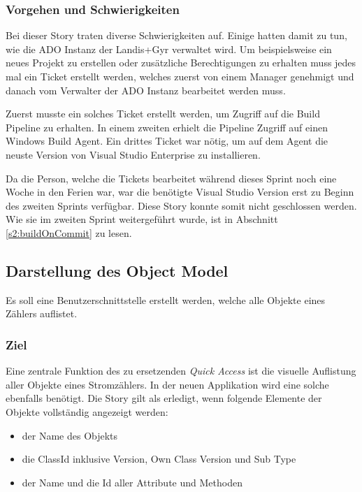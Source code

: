 \subsubsection{Vorgehen und Schwierigkeiten}
Bei dieser Story traten diverse Schwierigkeiten auf.
Einige hatten damit zu tun, wie die \ac{ADO} Instanz der Landis+Gyr verwaltet wird.
Um beispielsweise ein neues Projekt zu erstellen oder zusätzliche Berechtigungen zu erhalten muss jedes mal ein Ticket erstellt werden, welches zuerst von einem Manager genehmigt und danach vom Verwalter der \ac{ADO} Instanz bearbeitet werden muss.

Zuerst musste ein solches Ticket erstellt werden, um Zugriff auf die Build Pipeline zu erhalten.
In einem zweiten erhielt die Pipeline Zugriff auf einen Windows Build Agent.
Ein drittes Ticket war nötig, um auf dem Agent die neuste Version von Visual Studio Enterprise zu installieren.

Da die Person, welche die Tickets bearbeitet während dieses Sprint noch eine Woche in den Ferien war, war die benötigte Visual Studio Version erst zu Beginn des zweiten Sprints verfügbar.
Diese Story konnte somit nicht geschlossen werden.
Wie sie im zweiten Sprint weitergeführt wurde, ist in Abschnitt \ref{s2:buildOnCommit} zu lesen.


\subsection{Darstellung des Object Model}\label{visualizeOM}
\dq Es soll eine Benutzerschnittstelle erstellt werden, welche alle Objekte eines Zählers auflistet.\dq

\subsubsection{Ziel}
Eine zentrale Funktion des zu ersetzenden \textit{Quick Access} ist die visuelle Auflistung aller Objekte eines Stromzählers.
In der neuen Applikation wird eine solche ebenfalls benötigt.
Die Story gilt als erledigt, wenn folgende Elemente der Objekte vollständig angezeigt werden:
\begin{itemize}
   \item der Name des Objekts
   \item die ClassId inklusive Version, Own Class Version und Sub Type
   \item der Name und die Id aller Attribute und Methoden
\end{itemize}

